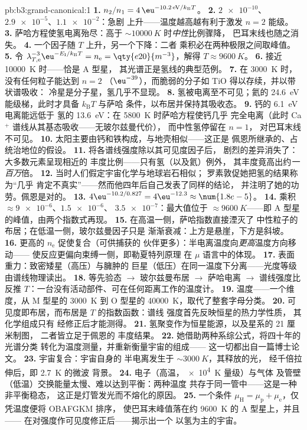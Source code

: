 \begin{solution}{pb:b3:grand-canonical:1}
\textbf{1.} $n_2/n_1 = 4\,\eu^{-10.2\,\text{eV}/k_{\text{B}}T}$。
\textbf{2.} $\num{2e-10}$、$\num{2.9e-5}$、$\num{1.1e-2}$：急剧
上升——温度越高越有利于激发 $n = 2$ 能级。
\textbf{3.} 萨哈方程使氢电离殆尽：高于
$\sim\qty{10000}{K}$ 时\emph{中性}比例骤降，
巴耳末线也随之消失。
\textbf{4.} 一个因子随 $T$ 上升，另一个下降：二者
乘积必在两种极限之间取峰值。
\textbf{5.} 令 $\lambda_{T,\text{e}}^{-3}\eu^{-E_{\text{I}}/
k_{\text{B}}T} = n_{\text{e}} = \qty{e20}{m^{-3}}$，解得 $T
\approx \qty{9600}{K}$。
\textbf{6.} 接近 \qty{10000}{K} 时——恰是 A 型星，
其光谱正是氢线的典型范例。
\textbf{7.} 在 \qty{3000}{K} 时，没有任何粒子能达到 $n = 2$
（$\eu^{-39}$），而脆弱的分子如 TiO 得以存续，并以带状谱吸收：
冷星是分子星，氢几乎不显现。
\textbf{8.} 氢被电离至不可见；氦的
\qty{24.6}{eV} 能级梯，此时才具备 $k_{\text{B}}T$ 与萨哈
条件，以布居并保持其吸收态。
\textbf{9.} 钙的 \qty{6.1}{eV} 电离能远低于
氢的 \qty{13.6}{eV}：在 \qty{5800}{K} 时萨哈方程使钙几乎
完全电离（此时 Ca$^+$ 谱线从其基态吸收——无玻尔兹曼代价），
而中性氢停留在 $n = 1$，
对巴耳末线不可见。
\textbf{10.} 太阳主要由钙和铁构成，与地壳相似——这正是
佩恩所继承的、占统治地位的假设。
\textbf{11.} 将各谱线强度除以其可见度因子后，
剧烈的差异消失了：大多数元素呈现相近的
丰度比例——只有氢（以及氦）例外，
其丰度竟高出约\emph{一百万}倍。
\textbf{12.} 当时人们假定宇宙化学与地球岩石相似；
罗素敦促她把氢的结果称为“几乎
肯定不真实”——然而他四年后自己发表了同样的结论，
并注明了她的功劳。佩恩是对的。
\textbf{13.} $4\eu^{-10.2/0.827} = 4\eu^{-12.3} \approx
\num{1.8e-5}$。
\textbf{14.} 乘积 $\approx \num{9e-6}$、$\num{1.5e-6}$、
$\num{3.5e-7}$：最大值位于 $\approx\qty{9600}{K}$——即
A 型星的峰值，由两个指数式再现。
\textbf{15.} 在高温一侧，萨哈指数直接湮灭了
中性粒子的布居；在低温一侧，玻尔兹曼因子只是
渐渐衰减：上方是悬崖，下方是斜坡。
\textbf{16.} 更高的 $n_{\text{e}}$ 促使复合（可供捕获的
伙伴更多）：半电离温度向\emph{更高}温度方向移动——
使反应更偏向束缚一侧，即勒夏特列原理
在 $\mu$ 语言中的体现。
\textbf{17.} 表面重力：致密矮星（高压）与臃肿的
巨星（低压）在同一温度下分离——光度等级
由谱线物理读出。
\textbf{18.} 等先验态 $\to$ 玻尔兹曼布居
$\to$ 萨哈电离 $\to$ 谱线强度比反推
$T$：一台没有活动部件、可在任何距离工作的温度计。
\textbf{19.} 温度——一个维度，从 M 型星的 \qty{3000}{K}
到 O 型星的 \qty{40000}{K}，取代了整套字母分类。
\textbf{20.} 可见度即布居，而布居是 $T$ 的指数函数：谱线
强度首先反映恒星的热力学性质，
其化学组成只有
经修正后才能测得。
\textbf{21.} 氢聚变作为恒星能源，以及星系的 21 厘米制图，
二者皆立足于佩恩的
丰度结果。
\textbf{22.} 她借助两种系综公式，将四十年的光谱分类
转化为温度测量，并重新衡量宇宙的组成——
这一切都出自一篇博士论文。
\textbf{23.} 宇宙复合：宇宙自身的
半电离发生于 $\sim\qty{3000}{K}$，其释放的光，
经千倍拉伸后，即 \qty{2.7}{K} 的微波
背景。
\textbf{24.} 电子（高温，\qty{e4}{K} 量级）与气体
及管壁（低温）交换能量太慢、难以达到平衡：两种温度
共存于同一管中——这是一种非平衡稳态，
这正是灯管发光而不熔化的原因。
\textbf{25.} 一个条件 $\mu_{\text{H}} = \mu_{\text{p}} +
\mu_{\text{e}}$，仅凭温度便将 OBAFGKM 排序，
使巴耳末峰值落在约 \qty{9600}{K} 的 A 型星上，并且——
在对强度作可见度修正后——揭示出一个
以氢为主的宇宙。
\end{solution}
